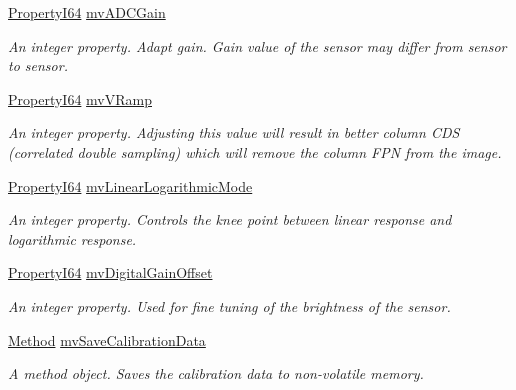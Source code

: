 \begin{DoxyCompactItemize}
\hyperlink{group___common_interface_ga81749b2696755513663492664a18a893}{Property\+I64} \hyperlink{classmv_i_m_p_a_c_t_1_1acquire_1_1_gen_i_cam_1_1_analog_control_acd17e28f62d7d954aaaf114b9f30cde0}{mv\+A\+D\+C\+Gain}
\begin{DoxyCompactList}\small\item\em An integer property. Adapt gain. Gain value of the sensor may differ from sensor to sensor. \end{DoxyCompactList}\item 
\hyperlink{group___common_interface_ga81749b2696755513663492664a18a893}{Property\+I64} \hyperlink{classmv_i_m_p_a_c_t_1_1acquire_1_1_gen_i_cam_1_1_analog_control_a5a2928716fc2c625c25536c7df8c9f6d}{mv\+V\+Ramp}
\begin{DoxyCompactList}\small\item\em An integer property. Adjusting this value will result in better column C\+D\+S (correlated double sampling) which will remove the column F\+P\+N from the image. \end{DoxyCompactList}\item 
\hyperlink{group___common_interface_ga81749b2696755513663492664a18a893}{Property\+I64} \hyperlink{classmv_i_m_p_a_c_t_1_1acquire_1_1_gen_i_cam_1_1_analog_control_ae88723ad284d25b43d01e9e538889b6c}{mv\+Linear\+Logarithmic\+Mode}
\begin{DoxyCompactList}\small\item\em An integer property. Controls the knee point between linear response and logarithmic response. \end{DoxyCompactList}\item 
\hyperlink{group___common_interface_ga81749b2696755513663492664a18a893}{Property\+I64} \hyperlink{classmv_i_m_p_a_c_t_1_1acquire_1_1_gen_i_cam_1_1_analog_control_a23a2490c9258a2d20483ccc0f1674ec7}{mv\+Digital\+Gain\+Offset}
\begin{DoxyCompactList}\small\item\em An integer property. Used for fine tuning of the brightness of the sensor. \end{DoxyCompactList}\item 
\hyperlink{classmv_i_m_p_a_c_t_1_1acquire_1_1_method}{Method} \hyperlink{classmv_i_m_p_a_c_t_1_1acquire_1_1_gen_i_cam_1_1_analog_control_ad209f1a9040fdf6d0bf14d116f22eeaf}{mv\+Save\+Calibration\+Data}
\begin{DoxyCompactList}\small\item\em A method object. Saves the calibration data to non-\/volatile memory. \end{DoxyCompactList}\end{DoxyCompactItemize}



